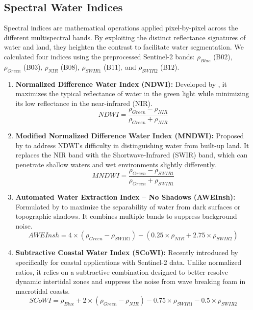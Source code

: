 ﻿\documentclass[ENG]{TFUOC}%
\begin{document}
\subsection{Spectral Water Indices}

Spectral indices are mathematical operations applied pixel-by-pixel across the different multispectral bands. By exploiting the distinct reflectance signatures of water and land, they heighten the contrast to facilitate water segmentation. We calculated four indices using the preprocessed Sentinel-2 bands: $\rho_{Blue}$ (B02), $\rho_{Green}$ (B03), $\rho_{NIR}$ (B08), $\rho_{SWIR1}$ (B11), and $\rho_{SWIR2}$ (B12).

\begin{enumerate}
    \item \textbf{Normalized Difference Water Index (NDWI):} Developed by \citet{mcfeeters_use_1996}, it maximizes the typical reflectance of water in the green light while minimizing its low reflectance in the near-infrared (NIR). 
    \begin{equation}
        NDWI = \frac{\rho_{Green} - \rho_{NIR}}{\rho_{Green} + \rho_{NIR}}
    \end{equation}

    \item \textbf{Modified Normalized Difference Water Index (MNDWI):} Proposed by \citet{xu_modification_2006} to address NDWI's difficulty in distinguishing water from built-up land. It replaces the NIR band with the Shortwave-Infrared (SWIR) band, which can penetrate shallow waters and wet environments slightly differently. 
    \begin{equation}
        MNDWI = \frac{\rho_{Green} - \rho_{SWIR1}}{\rho_{Green} + \rho_{SWIR1}}
    \end{equation}

    \item \textbf{Automated Water Extraction Index -- No Shadows (AWEInsh):} Formulated by \citet{feyisa_automated_2014} to maximize the separability of water from dark surfaces or topographic shadows. It combines multiple bands to suppress background noise.
    \begin{equation}
        AWEInsh = 4 \times (\rho_{Green} - \rho_{SWIR1}) - (0.25 \times \rho_{NIR} + 2.75 \times \rho_{SWIR2})
    \end{equation}

    \item \textbf{Subtractive Coastal Water Index (SCoWI):} Recently introduced by \citet{bergsma_shoreliner_2024} specifically for coastal applications with Sentinel-2 data. Unlike normalized ratios, it relies on a subtractive combination designed to better resolve dynamic intertidal zones and suppress the noise from wave breaking foam in macrotidal coasts.
    \begin{equation}
        SCoWI = \rho_{Blue} + 2 \times (\rho_{Green} - \rho_{NIR}) - 0.75 \times \rho_{SWIR1} - 0.5 \times \rho_{SWIR2}
    \end{equation}
\end{enumerate}
\end{document}
